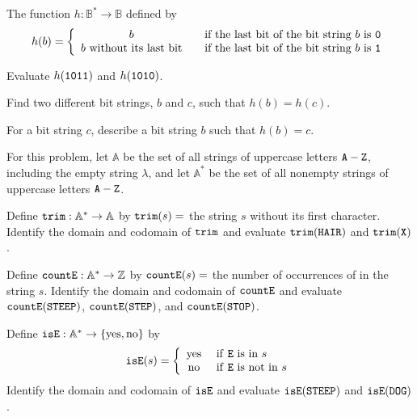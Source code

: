 \begin{exer}[\exerU] %
\label{exer_piecewise_bit_strings}
    The function $h: \mathbb{B}^* \to \mathbb{B}$ defined by 
    $$h(b) =  \left\{ \begin{array} {cl} b & \quad \text{if the last bit of the bit string } b \text{ is \texttt{0}} \\ b \text{ without its last bit} & \quad \text{if the last bit of the bit string } b \text{ is \texttt{1}} \\  \end{array} \right.$$
        \begin{exerpart}
            \item Evaluate $h(\texttt{1011})$ and $h(\texttt{1010})$.  
            \item Find two different bit strings, $b$ and $c$, such that $h(b) = h(c)$.
            \item For a bit string $c$, describe a bit string $b$ such that $h(b) = c$.
        \end{exerpart}
\end{exer}

\begin{exer}[\exerU] %
\label{exer_functions_strings}
For this problem, let $\mathbb{A}$ be the set of all strings of uppercase letters $\texttt{A}-\texttt{Z}$, including the empty string $\lambda$, and let $\mathbb{A}^*$ be the set of all nonempty strings of uppercase letters $\texttt{A}-\texttt{Z}$.
    \begin{exerpart}
        \item Define $\texttt{trim}:\mathbb{A}^* \to \mathbb{A}$ by $\texttt{trim}(s) = $ the string $s$ without its first character.  Identify the domain and codomain of $\texttt{trim}$ and evaluate $\texttt{trim}(\texttt{HAIR})$ and $\texttt{trim}(\texttt{X})$.

        \item Define $\texttt{countE}:\mathbb{A}^* \to \mathbb{Z}$ by $\texttt{countE}(s) = $ the number of occurrences of  in the string $s$.  Identify the domain and codomain of $\texttt{countE}$ and evaluate  $\texttt{countE}(\texttt{STEEP})$, $\texttt{countE}(\texttt{STEP})$, and $\texttt{countE}(\texttt{STOP})$. 

        \item Define $\texttt{isE}:\mathbb{A}^* \to \{\text{yes}, \text{no}\}$ by 
        $$\texttt{isE}(s) = \left\{
        \begin{array}{cl}
        \text{yes} & \text{ if \texttt{E} is in } s \\
        \text{no} & \text{ if \texttt{E} is not in } s \\
        \end{array}
        \right.$$
        Identify the domain and codomain of $\texttt{isE}$ and evaluate  $\texttt{isE}(\texttt{STEEP})$ and $\texttt{isE}(\texttt{DOG})$. 
    \end{exerpart}
\end{exer}

